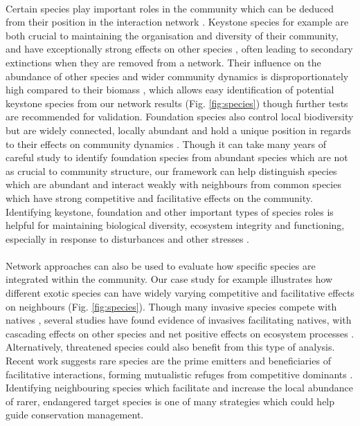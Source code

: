 \documentclass[a4,12pt]{article}
\begin{document}
        \paragraph{}
        Certain species play important roles in the community which can be deduced from their position in the interaction network \parencite{Cirtwill2018a}. Keystone species for example are both crucial to maintaining the organisation and diversity of their community, and have exceptionally strong effects on other species \parencite{Mills1993}, often leading to secondary extinctions when they are removed from a network. Their influence on the abundance of other species and wider community dynamics is disproportionately high compared to their biomass \parencite{Power1996, Piraino2002, Libralato2006}, which allows easy identification of potential keystone species from our network results (Fig. \ref{fig:species}) though further tests are recommended for validation. Foundation species also control local biodiversity but are widely connected, locally abundant and hold a unique position in regards to their effects on community dynamics \parencite{Ellison2005, Baiser2013, Ellison2019}. Though it can take many years of careful study to identify foundation species from abundant species which are not as crucial to community structure, our framework can help distinguish species which are abundant and interact weakly with neighbours from common species which have strong competitive and facilitative effects on the community. Identifying keystone, foundation and other important types of species roles is helpful for maintaining biological diversity, ecosystem integrity and functioning, especially in response to disturbances and other stresses \parencite{Nyakatya2008, Orwin2016, Losapio2017, Narwani2019}.

        \paragraph{}
        Network approaches can also be used to evaluate how specific species are integrated within the community. Our case study for example illustrates how different exotic species can have widely varying competitive and facilitative effects on neighbours (Fig. \ref{fig:species}). Though many invasive species compete with natives \parencite{Naeem2000, Riley2008, Zheng2015}, several studies have found evidence of invasives facilitating natives, with cascading effects on other species and net positive effects on ecosystem processes \parencite{Rodriguez2006, Ramus2017}. Alternatively, threatened species could also benefit from this type of analysis. Recent work suggests rare species are the prime emitters and beneficiaries of facilitative interactions, forming mutualistic refuges from competitive dominants \parencite{Calatayud2019, Hines2020}. Identifying neighbouring species which facilitate and increase the local abundance of rarer, endangered target species is one of many strategies which could help guide conservation management.
\end{document}
